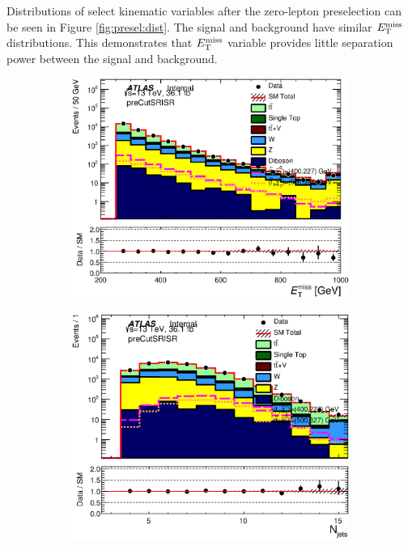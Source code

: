 \indent  Distributions of select kinematic variables after the zero-lepton preselection can be seen in Figure \ref{fig:presel:dist}.  The signal and background have similar $E_{\mathrm{T}}^{\mathrm{miss}}$ distributions.  This demonstrates that $E_{\mathrm{T}}^{\mathrm{miss}}$ variable provides little separation power between the signal and background. \\  

\begin{figure}[h!]
  \begin{center}
      \begin{subfigure}[b]{0.40\textwidth}    
    	 \includegraphics[width=\textwidth]{figures/plotRegion/Met_preCutSRISR_log.eps}
                \caption{ }
    \end{subfigure}
        \begin{subfigure}[b]{0.40\textwidth}    
    	 \includegraphics[width=\textwidth]{figures/plotRegion/NJets_preCutSRISR_log.eps}

\end{subfigure}
\end{center}
\end{figure}

